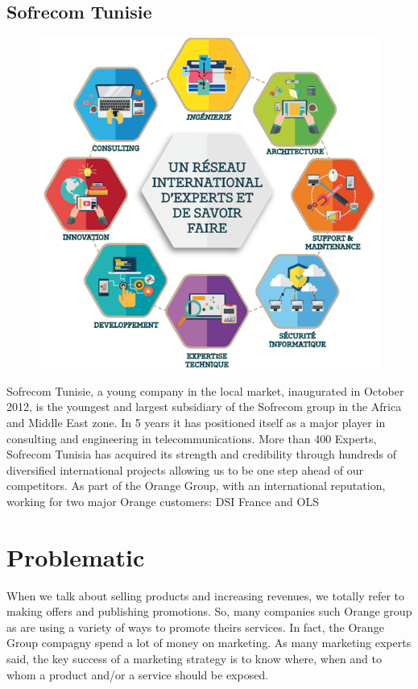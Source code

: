\subsection{Sofrecom Tunisie}
\label{sec:sec01}
\begin{figure}[h!]
	\centering
	\includegraphics[height=0.4\textheight]{fig01/sofrecomfields}
	\label{fig:FilialesEtClients}
\end{figure}
Sofrecom Tunisie, a young company in the local market, inaugurated in October 2012, is the youngest and largest subsidiary of the Sofrecom group in the Africa and Middle East zone.
In 5 years it has positioned itself as a major player in consulting and engineering in telecommunications.
More than 400 Experts, Sofrecom Tunisia has acquired its strength and credibility through hundreds of diversified international projects allowing us to be one step ahead of our competitors.
As part of the Orange Group, with an international reputation, working for two major Orange customers: DSI France and OLS


\section{Problematic}
\label{subsec:subsec01}

When we talk about selling products and increasing revenues, we totally refer to making offers and publishing promotions.
 So, many companies such Orange group as are using a variety of ways to promote theirs services. In fact, the Orange 
 Group compagny spend a lot of money on marketing. As many marketing experts said, the key success of a marketing strategy is to 
 know where, when and to whom a product and/or a service should be exposed. 
 
